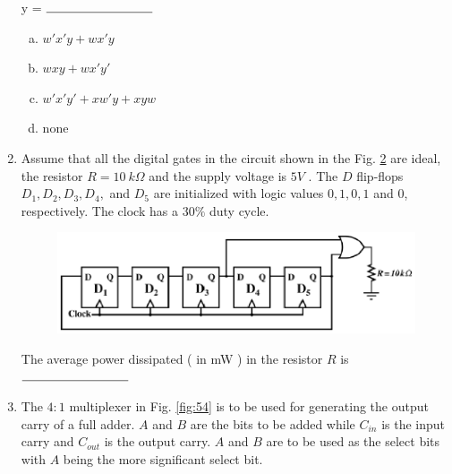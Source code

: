 \documentclass[journal,12pt,twocolumn]{IEEEtran}
\begin{document}
\begin{enumerate}
\begin{figure}
\caption{}

\label{fig:52}

\end{figure} 



y = $ \rule{3cm}{0.15mm}$

 
\begin{enumerate}[(a)]

\item $ w'x'y + wx'y $

\item $ wxy + wx'y' $

\item $ w'x'y' + xw'y + xyw $

\item none

\end{enumerate}

\item Assume that all the digital gates in the circuit shown in the Fig. \ref{fig:53} are ideal, the resistor $ R = 10 \ k\Omega $ and the supply voltage is $ 5 V $ .  The $D$ flip-flops $ D_1, D_2, D_3, D_4,$ and $D_5 $ are initialized with logic values $ 0,1,0,1 $ and $0$, respectively. The clock has a $ 30 \% $ duty cycle.

\begin{figure}

\centering

\includegraphics[width=\columnwidth]{./figs/59.eps}

\caption{}

\label{fig:53}

\end{figure} 



The average power dissipated ( in mW ) in the resistor $R$ is $ \rule{3cm}{0.15mm}$

\item The $ 4:1 $ multiplexer in Fig. \ref{fig:54} is to be used for generating the output carry of a full adder. $A$ and $B$ are the bits to be added while $ C_{in} $ is the input carry and $ C_{out} $ is the output carry. $A$ and $B$ are to be used as the select bits with $A$ being the more significant select bit.



\end{enumerate}
\end{document}
